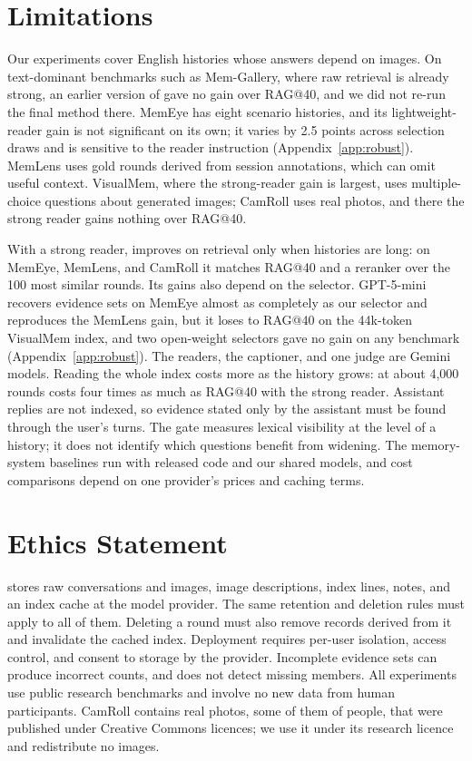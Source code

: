 \section*{Limitations}

Our experiments cover English histories whose answers depend on images. On text-dominant benchmarks such as Mem-Gallery, where raw retrieval is already strong, an earlier version of \vgs{} gave no gain over RAG@40, and we did not re-run the final method there. MemEye has eight scenario histories, and its lightweight-reader gain is not significant on its own; it varies by 2.5 points across selection draws and is sensitive to the reader instruction (Appendix~\ref{app:robust}). MemLens uses gold rounds derived from session annotations, which can omit useful context. VisualMem, where the strong-reader gain is largest, uses multiple-choice questions about generated images; CamRoll uses real photos, and there the strong reader gains nothing over RAG@40.

With a strong reader, \vgs{} improves on retrieval only when histories are long: on MemEye, MemLens, and CamRoll it matches RAG@40 and a reranker over the 100 most similar rounds. Its gains also depend on the selector. GPT-5-mini recovers evidence sets on MemEye almost as completely as our selector and reproduces the MemLens gain, but it loses to RAG@40 on the 44k-token VisualMem index, and two open-weight selectors gave no gain on any benchmark (Appendix~\ref{app:robust}). The readers, the captioner, and one judge are Gemini models. Reading the whole index costs more as the history grows: at about 4,000 rounds \vgs{} costs four times as much as RAG@40 with the strong reader. Assistant replies are not indexed, so evidence stated only by the assistant must be found through the user's turns. The gate measures lexical visibility at the level of a history; it does not identify which questions benefit from widening. The memory-system baselines run with released code and our shared models, and cost comparisons depend on one provider's prices and caching terms.

\section*{Ethics Statement}

\vgs{} stores raw conversations and images, image descriptions, index lines, notes, and an index cache at the model provider. The same retention and deletion rules must apply to all of them. Deleting a round must also remove records derived from it and invalidate the cached index. Deployment requires per-user isolation, access control, and consent to storage by the provider. Incomplete evidence sets can produce incorrect counts, and \vgs{} does not detect missing members. All experiments use public research benchmarks and involve no new data from human participants. CamRoll contains real photos, some of them of people, that were published under Creative Commons licences; we use it under its research licence and redistribute no images.
